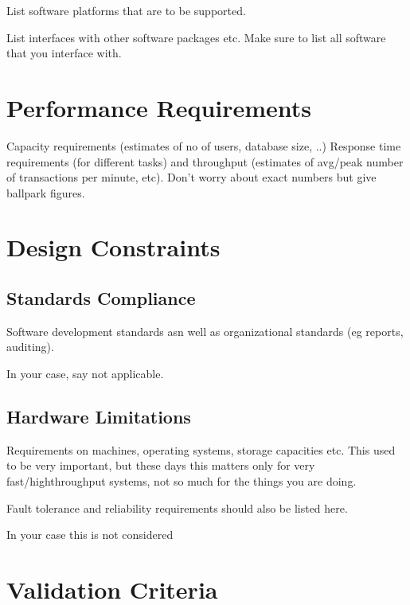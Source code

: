 \documentclass[a4wide]{article}
\begin{document}
\begin{itemize}
List software platforms that are to be supported.

List interfaces with other software packages etc.
Make sure to list all software that you interface with.



\section{Performance Requirements}

Capacity requirements (estimates of no of users, database size, ..)
Response time requirements (for different tasks)
and throughput (estimates of avg/peak number of transactions per minute, etc).
Don't worry about exact numbers but give ballpark figures.



\section{Design Constraints}

\subsection{Standards Compliance}

Software development standards asn well as organizational standards
(eg reports, auditing).

In your case, say not applicable.

\subsection{Hardware Limitations}

Requirements on machines, operating systems, storage capacities etc.
This used to be very important, but these days this matters only
for very fast/highthroughput systems, not so much for the things you
are doing.

Fault tolerance and reliability requirements should also be listed here.

In your case this is not considered



\section{Validation Criteria}


\end{itemize}
\end{document}
